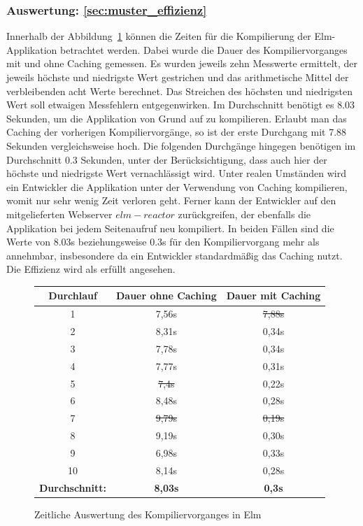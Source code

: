 \subsubsection{Auswertung: \ref{sec:muster_effizienz} }
Innerhalb der Abbildung~\ref{fig:compiler-times} können die Zeiten für die Kompilierung der Elm-Applikation betrachtet werden. Dabei wurde die Dauer des Kompiliervorganges mit und ohne Caching gemessen. Es wurden jeweils zehn Messwerte ermittelt, der jeweils höchste und niedrigste Wert gestrichen und das arithmetische Mittel der verbleibenden acht Werte berechnet. Das Streichen des höchsten und niedrigsten Wert soll etwaigen Messfehlern entgegenwirken. Im Durchschnitt benötigt es 8.03 Sekunden, um die Applikation von Grund auf zu kompilieren. Erlaubt man das Caching der vorherigen Kompiliervorgänge, so ist der erste Durchgang mit 7.88 Sekunden vergleichsweise hoch. Die folgenden Durchgänge hingegen benötigen im Durchschnitt 0.3 Sekunden, unter der Berücksichtigung, dass auch hier der höchste und niedrigste Wert vernachlässigt wird. Unter realen Umständen wird ein Entwickler die Applikation unter der Verwendung von Caching kompilieren, womit nur sehr wenig Zeit verloren geht. Ferner kann der Entwickler auf den mitgelieferten Webserver $elm-reactor$ zurückgreifen, der ebenfalls die Applikation bei jedem Seitenaufruf neu kompiliert. In beiden Fällen sind die Werte von 8.03s beziehungsweise 0.3s für den Kompiliervorgang mehr als annehmbar, insbesondere da ein Entwickler standardmäßig das Caching nutzt. Die Effizienz wird als erfüllt angesehen.
\begin{figure}[h]
\centering
\begin{tabular}{ | c | c | c |}
	\hline
	 \textbf{Durchlauf} 				& \textbf{Dauer ohne Caching} 	& \textbf{Dauer mit Caching}\\
	 \hline
	 1 & 7,56s & \st{7,88s} \\
	 \hline
	 2 & 8,31s & 0,34s\\
	 \hline
	 3 & 7,78s & 0,34s\\
	 \hline
	 4 & 7,77s & 0,31s\\
	 \hline
	 5 & \st{7,4s}& 0,22s\\
	 \hline
	 6 & 8,48s & 0,28s\\
	 \hline
	 7 & \st{9,79s} & \st{0,19s}\\
	 \hline
	 8 & 9,19s & 0,30s\\
	 \hline
	 9 & 6,98s & 0,33s\\
	 \hline
	 10 & 8,14s & 0,28s\\
	 \hhline{|=|=|=|}
	 \textbf{Durchschnitt:} & \textbf{8,03s} & \textbf{0,3s}\\
	 \hline
\end{tabular}
\caption{Zeitliche Auswertung des Kompiliervorganges in Elm}\label{fig:compiler-times}
\end{figure}
